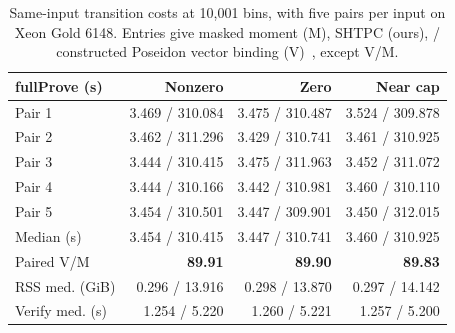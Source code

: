 \begin{table}[t]
\centering
\caption{Same-input transition costs at 10,001 bins, with five pairs per input on Xeon Gold 6148. Entries give masked moment (M), SHTPC (ours), / constructed Poseidon vector binding (V)~\cite{Grassi2021Poseidon}, except V/M.}
\label{tab:binding-cost}
\footnotesize
\renewcommand{\arraystretch}{1.06}
\setlength{\tabcolsep}{2pt}
\begin{tabular*}{\columnwidth}{@{\extracolsep{\fill}}lrrr@{}}
\toprule
\textbf{fullProve (s)} & \textbf{Nonzero} & \textbf{Zero} & \textbf{Near cap} \\
\midrule
Pair 1 & 3.469 / 310.084 & 3.475 / 310.487 & 3.524 / 309.878 \\
Pair 2 & 3.462 / 311.296 & 3.429 / 310.741 & 3.461 / 310.925 \\
Pair 3 & 3.444 / 310.415 & 3.475 / 311.963 & 3.452 / 311.072 \\
Pair 4 & 3.444 / 310.166 & 3.442 / 310.981 & 3.460 / 310.110 \\
Pair 5 & 3.454 / 310.501 & 3.447 / 309.901 & 3.450 / 312.015 \\
\midrule
\rowcolor{black!5} Median (s) & 3.454 / 310.415 & 3.447 / 310.741 & 3.460 / 310.925 \\
\rowcolor{black!5} Paired V/M & \textbf{89.91} & \textbf{89.90} & \textbf{89.83} \\
\midrule
RSS med. (GiB) & 0.296 / 13.916 & 0.298 / 13.870 & 0.297 / 14.142 \\
Verify med. (s) & 1.254 / 5.220 & 1.260 / 5.221 & 1.257 / 5.200 \\
\bottomrule
\end{tabular*}
\end{table}
